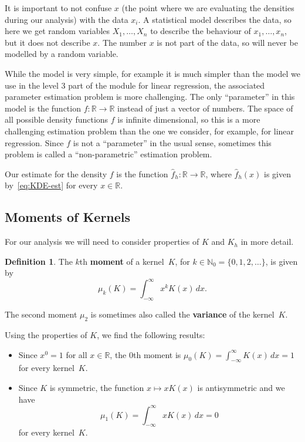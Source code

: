 \documentclass[
  a4paper,
]{article}
\theoremstyle{definition}
\newtheorem{definition}{Definition}[section]
\theoremstyle{definition}
\theoremstyle{definition}
\theoremstyle{definition}
\theoremstyle{remark}
\begin{document}
It is important to not confuse \(x\) (the point where we are evaluating
the densities during our analysis) with the data \(x_i\). A statistical
model describes the data, so here we get random variables \(X_1, \ldots, X_n\)
to describe the behaviour of \(x_1, \ldots, x_n\), but it does not describe \(x\).
The number \(x\) is not part of the data, so will never be modelled by a
random variable.

While the model is very simple, for example it is much simpler than the
model we use in the level 3 part of the module for linear regression,
the associated parameter estimation problem is more challenging.
The only ``parameter'' in this model is the function \(f \colon\mathbb{R}\to \mathbb{R}\)
instead of just a vector of numbers. The space of all possible density
functions \(f\) is infinite dimensional, so this is a more challenging
estimation problem than the one we consider, for example, for linear
regression. Since \(f\) is not a ``parameter'' in the usual sense, sometimes
this problem is called a ``non-parametric'' estimation problem.

Our estimate for the density \(f\) is the function \(\hat f_h\colon \mathbb{R}\to \mathbb{R}\),
where \(\hat f_h(x)\) is given by~\eqref{eq:KDE-est} for every \(x \in\mathbb{R}\).

\subsection{Moments of Kernels}\label{moments-of-kernels}

For our analysis we will need to consider properties of \(K\) and \(K_h\) in more
detail.

\begin{definition}
The \(k\)th \textbf{moment} of a kernel~\(K\),
for \(k \in \mathbb{N}_0 = \{0, 1, 2, \ldots\}\), is given by
\begin{equation*}
  \mu_k(K)
  = \int_{-\infty}^\infty x^k K(x) \,dx.
\end{equation*}
\end{definition}

The second moment \(\mu_2\) is sometimes also called the \textbf{variance}
of the kernel~\(K\).

Using the properties of \(K\), we find the following results:

\begin{itemize}
\item
  Since \(x^0 = 1\) for all \(x\in\mathbb{R}\),
  the \(0\)th moment is \(\mu_0(K) = \int_{-\infty}^\infty K(x) \,dx = 1\)
  for every kernel~\(K\).
\item
  Since \(K\) is symmetric, the function \(x \mapsto x K(x)\) is
  antisymmetric and we have
  \begin{equation*}
    \mu_1(K)
    = \int_{-\infty}^\infty x K(x) \,dx
    = 0
  \end{equation*}
  for every kernel~\(K\).
\end{itemize}
\end{document}
